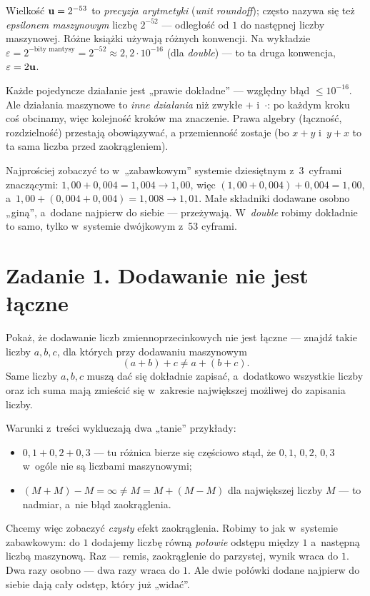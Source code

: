 \documentclass[11pt]{article}
\begin{document}
\begin{uwaga}
Wielkość $\mathbf{u}=2^{-53}$ to \emph{precyzja arytmetyki} (\emph{unit roundoff});
często nazywa się też \emph{epsilonem maszynowym} liczbę $2^{-52}$ --- odległość
od $1$ do następnej liczby maszynowej. Różne książki używają różnych konwencji.
Na wykładzie $\varepsilon=2^{-\text{bity mantysy}}=2^{-52}\approx2{,}2\cdot10^{-16}$
(dla \emph{double}) --- to ta druga konwencja, $\varepsilon=2\mathbf{u}$.
\end{uwaga}

\begin{intuicja}
Każde pojedyncze działanie jest „prawie dokładne” --- względny błąd
$\le10^{-16}$. Ale działania maszynowe to \emph{inne działania} niż
zwykłe $+$ i~$\cdot$: po każdym kroku coś obcinamy, więc kolejność kroków
ma znaczenie. Prawa algebry (łączność, rozdzielność) przestają obowiązywać,
a przemienność zostaje (bo $x+y$ i~$y+x$ to ta sama liczba przed
zaokrągleniem).

Najprościej zobaczyć to w~„zabawkowym” systemie dziesiętnym z~3~cyframi
znaczącymi: $1{,}00+0{,}004=1{,}004\to1{,}00$, więc
$(1{,}00+0{,}004)+0{,}004=1{,}00$, a~$1{,}00+(0{,}004+0{,}004)=1{,}008\to1{,}01$.
Małe składniki dodawane osobno „giną”, a~dodane najpierw do siebie ---
przeżywają. W~\emph{double} robimy dokładnie to samo, tylko w~systemie
dwójkowym z~53 cyframi.
\end{intuicja}

\section{Zadanie 1. Dodawanie nie jest łączne}
\begin{tresc}
Pokaż, że dodawanie liczb zmiennoprzecinkowych nie jest łączne --- znajdź
takie liczby $a,b,c$, dla których przy dodawaniu maszynowym
\[
(a+b)+c\ne a+(b+c).
\]
Same liczby $a,b,c$ muszą dać się dokładnie zapisać, a~dodatkowo wszystkie
liczby oraz ich suma mają zmieścić się w~zakresie największej możliwej do
zapisania liczby.
\end{tresc}

\begin{intuicja}
Warunki z~treści wykluczają dwa „tanie” przykłady:
\begin{itemize}
\item $0{,}1+0{,}2+0{,}3$ --- tu różnica bierze się częściowo stąd, że
$0{,}1$, $0{,}2$, $0{,}3$ w~ogóle nie są liczbami maszynowymi;
\item $(M+M)-M=\infty\ne M=M+(M-M)$ dla największej liczby $M$ --- to
nadmiar, a~nie błąd zaokrąglenia.
\end{itemize}
Chcemy więc zobaczyć \emph{czysty} efekt zaokrąglenia. Robimy to jak
w~systemie zabawkowym: do $1$ dodajemy liczbę równą \emph{połowie} odstępu
między $1$ a~następną liczbą maszynową. Raz --- remis, zaokrąglenie do
parzystej, wynik wraca do $1$. Dwa razy osobno --- dwa razy wraca do $1$.
Ale dwie połówki dodane najpierw do siebie dają cały odstęp, który już
„widać”.
\end{intuicja}
\end{document}
